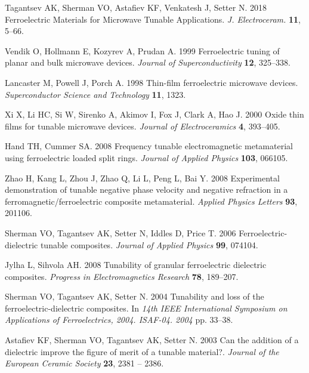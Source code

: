 \documentclass[%
 aip,
 amsmath,amssymb,
 reprint,%
]{revtex4-1}
\begin{document}
\begin{thebibliography}{99}

Tagantsev AK, Sherman VO, Astafiev KF, Venkatesh J, Setter N. 2018
  Ferroelectric {Materials} for {Microwave} {Tunable} {Applications}. {\em J.
  Electroceram.} \textbf{11}, 5--66.

Vendik O, Hollmann E, Kozyrev A, Prudan A. 1999  Ferroelectric tuning of planar
  and bulk microwave devices. {\em Journal of Superconductivity} \textbf{12},
  325--338.

Lancaster M, Powell J, Porch A. 1998  Thin-film ferroelectric microwave
  devices. {\em Superconductor Science and Technology} \textbf{11}, 1323.

Xi X, Li HC, Si W, Sirenko A, Akimov I, Fox J, Clark A, Hao J. 2000  Oxide thin
  films for tunable microwave devices. {\em Journal of Electroceramics}
  \textbf{4}, 393--405.

Hand TH, Cummer SA. 2008  Frequency tunable electromagnetic metamaterial using
  ferroelectric loaded split rings. {\em Journal of Applied Physics}
  \textbf{103}, 066105.

Zhao H, Kang L, Zhou J, Zhao Q, Li L, Peng L, Bai Y. 2008  Experimental
  demonstration of tunable negative phase velocity and negative refraction in a
  ferromagnetic/ferroelectric composite metamaterial. {\em Applied Physics
  Letters} \textbf{93}, 201106.

Sherman VO, Tagantsev AK, Setter N, Iddles D, Price T. 2006
  Ferroelectric-dielectric tunable composites. {\em Journal of Applied Physics}
  \textbf{99}, 074104.

Jylha L, Sihvola AH. 2008  Tunability of granular ferroelectric dielectric
  composites. {\em Progress in Electromagnetics Research} \textbf{78},
  189--207.

Sherman VO, Tagantsev AK, Setter N. 2004  Tunability and loss of the
  ferroelectric-dielectric composites. In {\em 14th {IEEE} {International}
  {Symposium} on {Applications} of {Ferroelectrics}, 2004. {ISAF}-04. 2004} pp.
  33--38.

Astafiev KF, Sherman VO, Tagantsev AK, Setter N. 2003  Can the addition of a
  dielectric improve the figure of merit of a tunable material?. {\em Journal
  of the European Ceramic Society} \textbf{23}, 2381 -- 2386.


\end{thebibliography}
\end{document}
